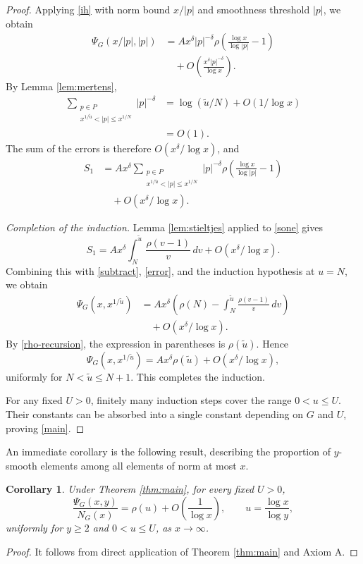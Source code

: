 \documentclass[a4paper]{amsart}
\newtheorem{corollary}[theorem]{Corollary}
\begin{document}
\begin{proof}
Applying \eqref{ih} with norm bound $x/|p|$ and
smoothness threshold $|p|$, we obtain
\begin{align*}
\Psi_G(x/|p|,|p|)
&=
Ax^\delta|p|^{-\delta}
\rho\!\left(\frac{\log x}{\log|p|}-1\right)\\
&\quad+
O\!\left(
\frac{x^\delta|p|^{-\delta}}{\log x}
\right).
\end{align*}
By Lemma \ref{lem:mertens},
\begin{align*}
\sum_{\substack{p\in P\\
x^{1/\tilde u}<|p|\le x^{1/N}}}|p|^{-\delta}
&=
\log(\tilde u/N)+O(1/\log x)\\
&=O(1).
\end{align*}
The sum of the errors is therefore
$O(x^\delta/\log x)$, and
\begin{equation}\label{sone}
\begin{split}
S_1
&=
Ax^\delta
\sum_{\substack{p\in P\\
x^{1/\tilde u}<|p|\le x^{1/N}}}
|p|^{-\delta}
\rho\!\left(\frac{\log x}{\log|p|}-1\right)\\
&\quad+O(x^\delta/\log x).
\end{split}
\end{equation}

\smallskip
\noindent\emph{Completion of the induction.}
Lemma \ref{lem:stieltjes} applied to \eqref{sone} gives
\[
S_1
=
Ax^\delta
\int_N^{\tilde u}\frac{\rho(v-1)}v\,dv
+O(x^\delta/\log x).
\]
Combining this with \eqref{subtract}, \eqref{error},
and the induction hypothesis at $u=N$, we obtain
\begin{align*}
\Psi_G(x,x^{1/\tilde u})
&=
Ax^\delta
\left(
\rho(N)-\int_N^{\tilde u}\frac{\rho(v-1)}v\,dv
\right)\\
&\quad+O(x^\delta/\log x).
\end{align*}
By \eqref{rho-recursion}, the expression in parentheses
is $\rho(\tilde u)$. Hence
\[
\Psi_G(x,x^{1/\tilde u})
=
Ax^\delta\rho(\tilde u)
+O(x^\delta/\log x),
\]
uniformly for $N<\tilde u\le N+1$.
This completes the induction.

For any fixed $U>0$, finitely many induction steps cover the range
$0<u\le U$. Their constants can be absorbed into a single
constant depending on $G$ and $U$, proving \eqref{main}.
\end{proof}

An immediate corollary is the following result, describing the proportion of $y$-smooth elements among all elements of norm at most $x$.
\begin{corollary}\label{cor:smooth-proportion}
Under Theorem \ref{thm:main}, for every fixed $U>0$,
$$
\frac{\Psi_{G}(x,y)}{N_G(x)}
=
\rho(u)+O\!\left(\frac{1}{\log x}\right),
\qquad
u=\frac{\log x}{\log y},
$$
uniformly for $y\ge2$ and $0<u\le U$, as $x\to\infty$.
\end{corollary}
\begin{proof}
    It follows from direct application of Theorem \ref{thm:main} and Axiom A.
\end{proof}
\end{document}
